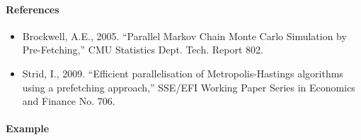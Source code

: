 \paragraph{References}\label{references}

\begin{itemize}
\item
  Brockwell, A.E., 2005. ``Parallel Markov Chain Monte Carlo Simulation
  by Pre-Fetching,'' CMU Statistics Dept. Tech. Report 802.
\item
  Strid, I., 2009. ``Efficient parallelisation of Metropolis-Hastings
  algorithms using a prefetching approach,'' SSE/EFI Working Paper
  Series in Economics and Finance No. 706.
\end{itemize}

\paragraph{Example}\label{example}


